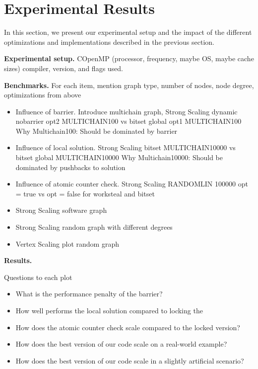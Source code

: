 \documentclass[letterpaper]{article}
\newcommand{\Cpp}{C\nolinebreak[4]\hspace{-.05em}\raisebox{.2ex}{\small \bf ++}}
\newcommand{\mypar}[1]{{\bf #1.}}
\begin{document}
\begin{invisible}
\end{invisible}

\section{Experimental Results}\label{sec:exp}
In this section, we present our experimental setup and the impact of the different optimizations and implementations described in the previous section.

\begin{invisible}
 \mypar{Experimental setup}
 \Cpp  OpenMP
 (processor, frequency, maybe OS, maybe cache sizes)
 compiler, version, and flags used.

 \mypar{Benchmarks}
 For each item, mention graph type, number of nodes, node degree, optimizations from above
 \begin{itemize}
  \item Influence of barrier. Introduce multichain graph, Strong Scaling dynamic nobarrier opt2 MULTICHAIN100 vs bitset global opt1 MULTICHAIN100 Why Multichain100: Should be dominated by barrier%
  \item Influence of local solution. Strong Scaling bitset MULTICHAIN10000 vs bitset global MULTICHAIN10000 Why Multichain10000: Should be dominated by pushbacks to solution
  \item Influence of atomic counter check. Strong Scaling RANDOMLIN 100000 opt = true vs opt = false for worksteal and bitset
  \item Strong Scaling software graph \cite{musco2014generative}
  \item Strong Scaling random graph with different degrees
  \item Vertex Scaling plot random graph
 \end{itemize}

\mypar{Results}

Questions to each plot
\begin{itemize}
 \item What is the performance penalty of the barrier?
 \item How well performs the local solution compared to locking the 
 \item How does the atomic counter check scale compared to the locked version?
 \item How does the best version of our code scale on a real-world example?
 \item How does the best version of our code scale in a slightly artificial scenario?
\end{itemize}
\end{invisible}
\end{document}
